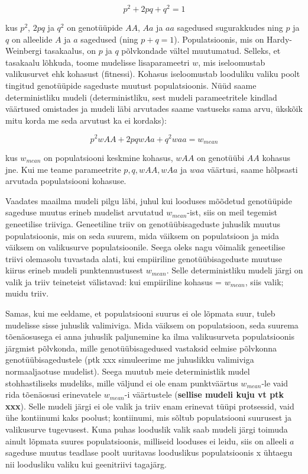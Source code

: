 \documentclass[]{book}
\begin{document}
\[p^2 + 2pq + q^2 = 1\]

kus \(p^2\), \(2pq\) ja \(q^2\) on genotüüpide \(AA\), \(Aa\) ja \(aa\)
sagedused sugurakkudes ning \(p\) ja \(q\) on alleelide \(A\) ja \(a\)
sagedused (ning \(p + q = 1\)). Populatsioonis, mis on Hardy-Weinbergi
tasakaalus, on \(p\) ja \(q\) põlvkondade vältel muutumatud. Selleks, et
tasakaalu lõhkuda, toome mudelisse lisaparameetri \(w\), mis
iseloomustab valikusurvet ehk kohasust (fitnessi). Kohasus iseloomustab
looduliku valiku poolt tingitud genotüüpide sageduste muutust
populatsioonis. Nüüd saame deterministliku mudeli (deterministliku, sest
mudeli parameetritele kindlad väärtused omistades ja mudeli läbi
arvutades saame vastuseks sama arvu, ükskõik mitu korda me seda arvutust
ka ei kordaks):

\[p^2wAA + 2pqwAa + q^2waa = w_{mean}\]

kus \(w_{mean}\) on populatsiooni keskmine kohasus, \(wAA\) on genotüübi
\(AA\) kohasus jne. Kui me teame parameetrite \(p, q, wAA, wAa\) ja
\(waa\) väärtusi, saame hõlpsasti arvutada populatsiooni kohasuse.

Vaadates maailma mudeli pilgu läbi, juhul kui looduses mõõdetud
genotüüpide sageduse muutus erineb mudelist arvutatud \(w_{mean}\)-ist,
siis on meil tegemist geneetilise triiviga. Geneetiline triiv on
genotüübisageduste juhuslik muutus populatsioonis, mis on seda suurem,
mida väiksem on populatsioon ja mida väiksem on valikusurve
populatsioonile. Seega oleks nagu võimalik geneetilise triivi olemasolu
tuvastada alati, kui empiiriline genotüübisageduste muutuse kiirus
erineb mudeli punktennustusest \(w_{mean}\). Selle deterministliku
mudeli järgi on valik ja triiv teineteist välistavad: kui empiiriline
kohasus = \(w_{mean}\), siis valik; muidu triiv.

Samas, kui me eeldame, et populatsiooni suurus ei ole lõpmata suur,
tuleb mudelisse sisse juhuslik valimiviga. Mida väiksem on populatsioon,
seda suurema tõenäosusega ei anna juhuslik paljunemine ka ilma
valikusurveta populatsioonis järgmist põlvkonda, mille
genotüübisagedused vastaksid eelmise põlvkonna genotüübisagedustele (ptk
xxx simuleerime me juhuslikku valimiviga normaaljaotuse mudelist). Seega
muutub meie deterministlik mudel stohhastiliseks mudeliks, mille väljund
ei ole enam punktväärtus \(w_{mean}\)-le vaid rida tõenäosusi
erinevatele \(w_{mean}\)-i väärtustele (\textbf{sellise mudeli kuju vt
ptk xxx}). Selle mudeli järgi ei ole valik ja triiv enam erinevat tüüpi
protsessid, vaid ühe kontiinumi kaks poolust; kontiinumi, mis sõltub
populatsiooni suurusest ja valikusurve tugevusest. Kuna puhas looduslik
valik saab mudeli järgi toimuda ainult lõpmata suures populatsioonis,
milliseid looduses ei leidu, siis on alleeli \(a\) sageduse muutus
teadlase poolt uuritavas looduslikus populatsioonis x ühtaegu nii
loodusliku valiku kui geenitriivi tagajärg.
\end{document}
